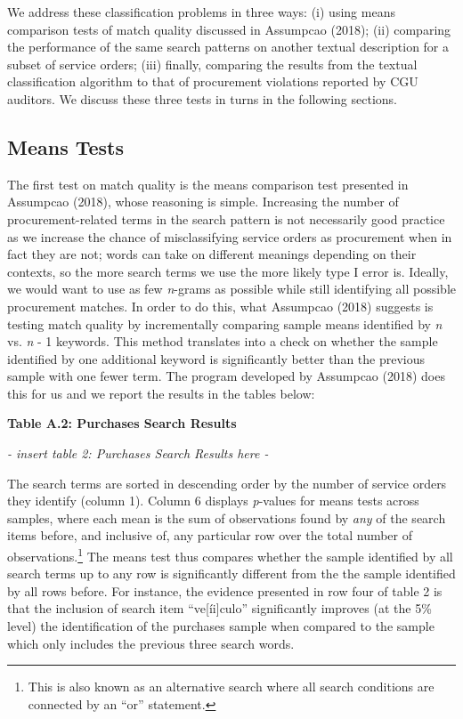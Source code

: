 \documentclass[]{article}
\let\rmarkdownfootnote\footnote%
\def\footnote{\protect\rmarkdownfootnote}
\theoremstyle{definition}
\theoremstyle{definition}
\theoremstyle{definition}
\theoremstyle{remark}
\begin{document}
We address these classification problems in three ways: (i) using means
comparison tests of match quality discussed in Assumpcao (2018); (ii)
comparing the performance of the same search patterns on another textual
description for a subset of service orders; (iii) finally, comparing the
results from the textual classification algorithm to that of procurement
violations reported by CGU auditors. We discuss these three tests in
turns in the following sections.

\hypertarget{quality1}{%
\subsection{Means Tests}\label{quality1}}

The first test on match quality is the means comparison test presented
in Assumpcao (2018), whose reasoning is simple. Increasing the number of
procurement-related terms in the search pattern is not necessarily good
practice as we increase the chance of misclassifying service orders as
procurement when in fact they are not; words can take on different
meanings depending on their contexts, so the more search terms we use
the more likely type I error is. Ideally, we would want to use as few
\emph{n}-grams as possible while still identifying all possible
procurement matches. In order to do this, what Assumpcao (2018) suggests
is testing match quality by incrementally comparing sample means
identified by \emph{n} vs. \emph{n} - 1 keywords. This method translates
into a check on whether the sample identified by one additional keyword
is significantly better than the previous sample with one fewer term.
The program developed by Assumpcao (2018) does this for us and we report
the results in the tables below:

\textbf{Table A.2: Purchases Search Results}

\emph{- insert table 2: Purchases Search Results here -}

The search terms are sorted in descending order by the number of service
orders they identify (column 1). Column 6 displays \emph{p}-values for
means tests across samples, where each mean is the sum of observations
found by \emph{any} of the search items before, and inclusive of, any
particular row over the total number of observations.\footnote{This is
  also known as an alternative search where all search conditions are
  connected by an ``or'' statement.} The means test thus compares
whether the sample identified by all search terms up to any row is
significantly different from the the sample identified by all rows
before. For instance, the evidence presented in row four of table 2 is
that the inclusion of search item ``ve{[}íi{]}culo'' significantly
improves (at the 5\% level) the identification of the purchases sample
when compared to the sample which only includes the previous three
search words.
\end{document}
